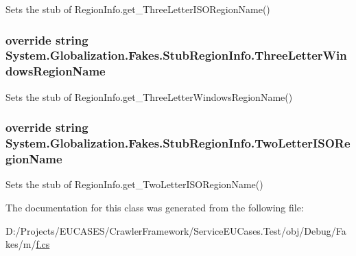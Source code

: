 Sets the stub of Region\-Info.\-get\-\_\-\-Three\-Letter\-I\-S\-O\-Region\-Name()

\hypertarget{class_system_1_1_globalization_1_1_fakes_1_1_stub_region_info_a3f58f1291c2bea786cf6b516bcc5ee25}{
\subsubsection[{Three\-Letter\-Windows\-Region\-Name}]{\setlength{\rightskip}{0pt plus 5cm}override string System.\-Globalization.\-Fakes.\-Stub\-Region\-Info.\-Three\-Letter\-Windows\-Region\-Name\hspace{0.3cm}{\ttfamily [get]}}}\label{class_system_1_1_globalization_1_1_fakes_1_1_stub_region_info_a3f58f1291c2bea786cf6b516bcc5ee25}


Sets the stub of Region\-Info.\-get\-\_\-\-Three\-Letter\-Windows\-Region\-Name()

\hypertarget{class_system_1_1_globalization_1_1_fakes_1_1_stub_region_info_a31ac12a8385536424670fd0d70e6d089}{
\subsubsection[{Two\-Letter\-I\-S\-O\-Region\-Name}]{\setlength{\rightskip}{0pt plus 5cm}override string System.\-Globalization.\-Fakes.\-Stub\-Region\-Info.\-Two\-Letter\-I\-S\-O\-Region\-Name\hspace{0.3cm}{\ttfamily [get]}}}\label{class_system_1_1_globalization_1_1_fakes_1_1_stub_region_info_a31ac12a8385536424670fd0d70e6d089}


Sets the stub of Region\-Info.\-get\-\_\-\-Two\-Letter\-I\-S\-O\-Region\-Name()



The documentation for this class was generated from the following file\-:\begin{DoxyCompactItemize}
\item 
D\-:/\-Projects/\-E\-U\-C\-A\-S\-E\-S/\-Crawler\-Framework/\-Service\-E\-U\-Cases.\-Test/obj/\-Debug/\-Fakes/m/\hyperlink{m_2f_8cs}{f.\-cs}\end{DoxyCompactItemize}
